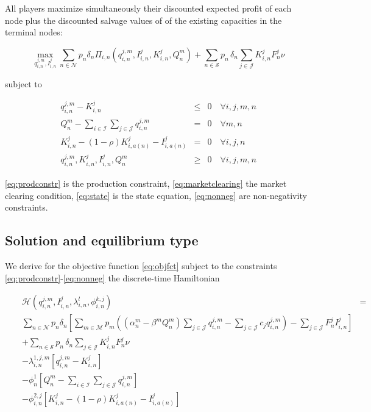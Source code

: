 All players maximize simultaneously their discounted expected profit of each node plus the discounted salvage values of of the existing capacities in the terminal nodes:

\begin{equation}
  \label{eq:objfct}
  \max_{q_{i,n}^{j,m}, I_{i,n}^{j}} \sum_{n\in \mathcal{N}}p_n\delta_n\Pi_{i,n}\left(q_{i,n}^{j,m}, I_{i,n}^{j}, K_{i,n}^{j}, Q_n^m\right)+ \sum_{n\in \mathcal{S}}p_n\,\delta_n \sum_{j\in \mathcal{J}}K_{i,n}^{j}F_n^{j}\nu
\end{equation}

subject to
  
\begin{eqnarray}  
q_{i,n}^{j,m} - K_{i,n}^{j} &\leq& 0 \quad \forall i,j,m,n \label{eq:prodconstr} \\
Q_n^m-\sum_{i\in \mathcal{I}}\sum_{j\in \mathcal{J}} q_{i,n}^{j,m} &=& 0 \quad \forall m,n \label{eq:marketclearing}\\
K_{i,n}^{j} - (1-\rho)K_{i,a(n)}^{j}-I_{i,a(n)}^{j} &=& 0 \quad \forall i,j,n \label{eq:state} \\
q_{i,n}^{j,m}, K_{i,n}^{j}, I_{i,n}^{j}, Q_n^m  &\geq& 0 \quad \forall i,j,m,n\label{eq:nonneg}
\end{eqnarray}

\eqref{eq:prodconstr} is the production constraint, \eqref{eq:marketclearing} the market clearing condition, \eqref{eq:state} is the state equation, \eqref{eq:nonneg} are non-negativity constraints.

\subsection{Solution and equilibrium type}
\label{sec:solution}

We derive for the objective function \eqref{eq:objfct} subject to the constraints \eqref{eq:prodconstr}-\eqref{eq:nonneg} the discrete-time Hamiltonian

\begin{align}
  \label{eq:kkt1}
  && \mathcal{H}(q_{i,n}^{j,m}, I_{i,n}^{j},\lambda_{i,n}^{l},\phi_{i,n}^{k,j}) &=& \\
  && \sum_{n\in \mathcal{N}}p_n\delta_n\left[ \sum_{m\in\mathcal{M}}p_m\left( \left(\alpha_n^m-\beta^m Q_n^m \right)\sum_{j\in \mathcal{J}}q_{i,n}^{j,m}-\sum_{j\in \mathcal{J}}c_jq_{i,n}^{j,m}\right)-\sum_{j\in \mathcal{J}}F_n^{j}I_{i,n}^{j}\right]\nonumber\\
&&+ \sum_{n\in \mathcal{S}}p_n\,\delta_n \sum_{j\in \mathcal{J}}K_{i,n}^{j}F_n^{j}\nu\nonumber\\
 && - \lambda_{i,n}^{1,j,m}\left[q_{i,n}^{j,m} - K_{i,n}^{j}\right]\nonumber\\
 &&  - \phi_{n}^{1}\left[Q_n^m-\sum_{i\in \mathcal{I}}\sum_{j\in \mathcal{J}} q_{i,n}^{j,m}\right]\nonumber\\
 &&  - \phi_{i,n}^{2,j}\left[K_{i,n}^{j} - (1-\rho)K_{i,a(n)}^{j}-I_{i,a(n)}^{j}\right]\nonumber
\end{align}

